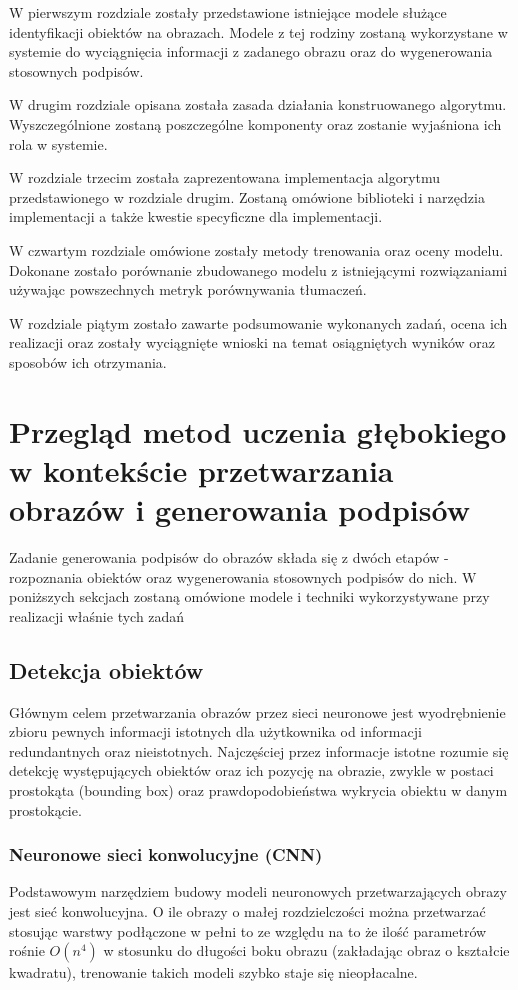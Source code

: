 W pierwszym rozdziale zostały przedstawione istniejące modele służące identyfikacji obiektów na obrazach. Modele z tej rodziny zostaną wykorzystane w systemie do wyciągnięcia informacji z zadanego obrazu oraz do wygenerowania stosownych podpisów. \par
W drugim rozdziale opisana została zasada działania konstruowanego algorytmu. Wyszczególnione zostaną poszczególne komponenty oraz zostanie wyjaśniona ich rola w systemie. \par
W rozdziale trzecim została zaprezentowana implementacja algorytmu przedstawionego w rozdziale drugim. Zostaną omówione biblioteki i narzędzia implementacji a także kwestie specyficzne dla implementacji. \par
W czwartym rozdziale omówione zostały metody trenowania oraz oceny modelu. Dokonane zostało porównanie zbudowanego modelu z istniejącymi rozwiązaniami używając powszechnych metryk porównywania tłumaczeń. \par
W rozdziale piątym zostało zawarte podsumowanie wykonanych zadań, ocena ich realizacji oraz zostały wyciągnięte wnioski na temat osiągniętych wyników oraz sposobów ich otrzymania.

\newpage 
 
\section{Przegląd metod uczenia głębokiego w kontekście przetwarzania obrazów i generowania podpisów}
Zadanie generowania podpisów do obrazów składa się z dwóch etapów - rozpoznania obiektów oraz wygenerowania stosownych podpisów do nich. W poniższych sekcjach zostaną omówione modele i techniki wykorzystywane przy realizacji właśnie tych zadań
\subsection{Detekcja obiektów}
Głównym celem przetwarzania obrazów przez sieci neuronowe jest wyodrębnienie zbioru pewnych informacji istotnych dla użytkownika od informacji redundantnych oraz nieistotnych. Najczęściej przez informacje istotne rozumie się detekcję występujących obiektów oraz ich pozycję na obrazie, zwykle w postaci prostokąta (bounding box) oraz prawdopodobieństwa wykrycia obiektu w danym prostokącie.
\subsubsection{Neuronowe sieci konwolucyjne (CNN)}
Podstawowym narzędziem budowy modeli neuronowych przetwarzających obrazy jest sieć konwolucyjna. O ile obrazy o małej rozdzielczości można przetwarzać stosując warstwy podłączone w pełni to ze względu na to że ilość parametrów rośnie $O(n^4)$ w stosunku do długości boku obrazu (zakładając obraz o kształcie kwadratu), trenowanie takich modeli szybko staje się nieopłacalne.

